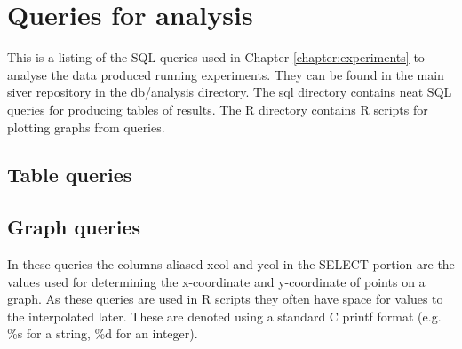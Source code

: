 \chapter{Queries for analysis}\label{chapter:sql}
This is a listing of the SQL queries used in Chapter \ref{chapter:experiments} to analyse the data produced running experiments. They can be found in the main siver repository in the db/analysis directory. The sql directory contains neat SQL queries for producing tables of results. The R directory contains R scripts for plotting graphs from queries.

\section{Table queries}











\section{Graph queries}
In these queries the columns aliased xcol and ycol in the SELECT portion are the values used for determining the x-coordinate and y-coordinate of points on a graph. As these queries are used in R scripts they often have space for values to the interpolated later. These are denoted using a standard C printf format (e.g. \%s for a string, \%d for an integer).





